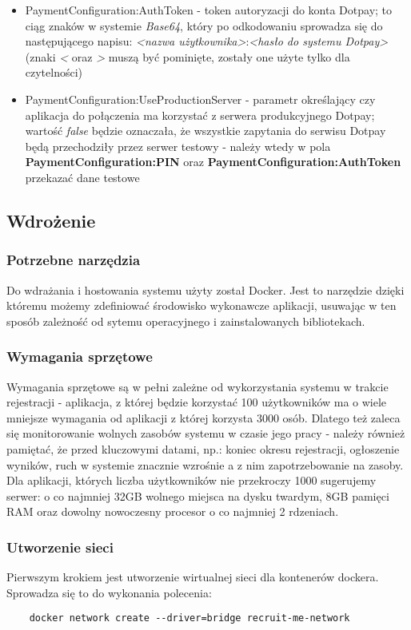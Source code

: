 \documentclass{article}
\begin{document}
\begin{itemize}
    \item PaymentConfiguration:AuthToken - token autoryzacji do konta Dotpay; to ciąg znaków w systemie \emph{Base64}, który po odkodowaniu sprowadza się do następującego napisu: \emph{<nazwa użytkownika>}:\emph{<hasło do systemu Dotpay>} (znaki \emph{<} oraz \emph{>} muszą być pominięte, zostały one użyte tylko dla czytelności)
    \item PaymentConfiguration:UseProductionServer - parametr określający czy aplikacja do połączenia ma korzystać z serwera produkcyjnego Dotpay; wartość \emph{false} będzie oznaczała, że wszystkie zapytania do serwisu Dotpay będą przechodziły przez serwer testowy - należy wtedy w pola \textbf{PaymentConfiguration:PIN} oraz \textbf{PaymentConfiguration:AuthToken} przekazać dane testowe
\end{itemize}
\subsection{Wdrożenie}
\subsubsection{Potrzebne narzędzia}
Do wdrażania i hostowania systemu użyty został Docker. Jest to narzędzie dzięki któremu możemy zdefiniować środowisko wykonawcze aplikacji, usuwając w ten sposób zależność od sytemu operacyjnego i zainstalowanych bibliotekach.
\subsubsection{Wymagania sprzętowe}
Wymagania sprzętowe są w pełni zależne od wykorzystania systemu w trakcie rejestracji -  aplikacja, z której będzie korzystać 100 użytkowników ma o wiele mniejsze wymagania od aplikacji z której korzysta 3000 osób. Dlatego też zaleca się monitorowanie wolnych zasobów systemu w czasie jego pracy - należy również pamiętać, że przed kluczowymi datami, np.: koniec okresu rejestracji, ogłoszenie wyników, ruch w systemie znacznie wzrośnie a z nim zapotrzebowanie na zasoby. Dla aplikacji, których liczba użytkowników nie przekroczy 1000 sugerujemy serwer: o co najmniej 32GB wolnego miejsca na dysku twardym, 8GB pamięci RAM oraz dowolny nowoczesny procesor o co najmniej 2 rdzeniach.
\subsubsection{Utworzenie sieci}
Pierwszym krokiem jest utworzenie wirtualnej sieci dla kontenerów dockera. Sprowadza się to do wykonania polecenia:
\begin{verbatim}
    docker network create --driver=bridge recruit-me-network
\end{verbatim}
\end{document}
